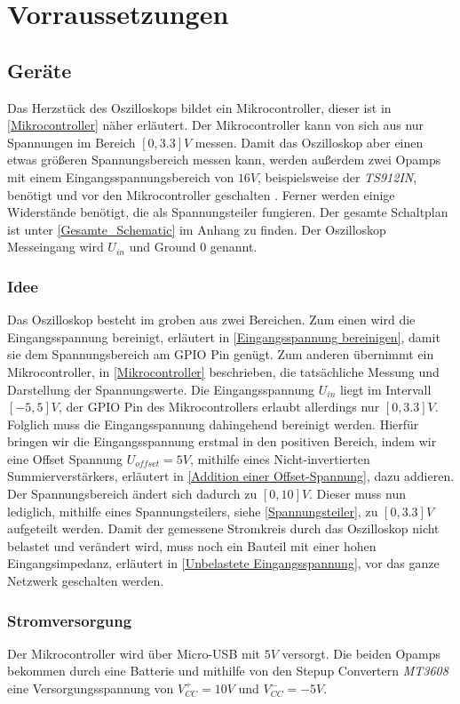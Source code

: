 \section{Vorraussetzungen}
\label{Vorraussetzungen}


\subsection{Geräte}

Das Herzstück des Oszilloskops bildet ein Mikrocontroller, dieser ist in \ref{Mikrocontroller} näher
erläutert.
Der Mikrocontroller kann von sich aus nur Spannungen im Bereich $[0, 3.3]V$ messen.
Damit das Oszilloskop aber einen etwas größeren Spannungsbereich messen kann, werden außerdem
zwei Opamps mit einem Eingangsspannungsbereich von $16V$, beispielsweise der \textit{TS912IN},
benötigt und vor den Mikrocontroller geschalten \cite{Opamp_Datasheet}.
Ferner werden einige Widerstände benötigt, die als Spannungsteiler fungieren.
Der gesamte Schaltplan ist unter \ref{Gesamte_Schematic} im Anhang zu finden.
Der Oszilloskop Messeingang wird $U_{in}$ und Ground $0$ genannt.

\subsubsection{Idee}
Das Oszilloskop besteht im groben aus zwei Bereichen.
Zum einen wird die Eingangsspannung bereinigt, erläutert in \ref{Eingangsspannung bereinigen},
damit sie dem Spannungsbereich am GPIO Pin genügt.
Zum anderen übernimmt ein Mikrocontroller, in \ref{Mikrocontroller} beschrieben,
die tatsächliche Messung und Darstellung der Spannungswerte. \newline
Die Eingangsspannung $U_{in}$ liegt im Intervall $[-5, 5] V$,
der GPIO Pin des Mikrocontrollers erlaubt allerdings nur $[0, 3.3] V$. \newline
Folglich muss die Eingangsspannung dahingehend bereinigt werden.
\newline \newline
Hierfür bringen wir die Eingangsspannung erstmal in den positiven Bereich, indem wir
eine Offset Spannung $U_{offset} = 5V$, mithilfe eines Nicht-invertierten Summierverstärkers,
erläutert in \ref{Addition einer Offset-Spannung}, dazu addieren. \newline
Der Spannungsbereich ändert sich dadurch zu $[0, 10] V$.
Dieser muss nun lediglich, mithilfe eines Spannungsteilers, siehe \ref{Spannungsteiler},
zu $[0, 3.3] V$ aufgeteilt werden.
Damit der gemessene Stromkreis durch das Oszilloskop nicht belastet und verändert wird,
muss noch ein Bauteil mit einer hohen Eingangsimpedanz, erläutert in \ref{Unbelastete Eingangsspannung},
vor das ganze Netzwerk geschalten werden.


\subsubsection{Stromversorgung}
Der Mikrocontroller wird über Micro-USB mit $5V$ versorgt.
Die beiden Opamps bekommen durch eine Batterie und mithilfe von den Stepup Convertern \textit{MT3608}
eine Versorgungsspannung von $V^{+}_{CC} = 10V$ und $V^{-}_{CC} = -5V$.



